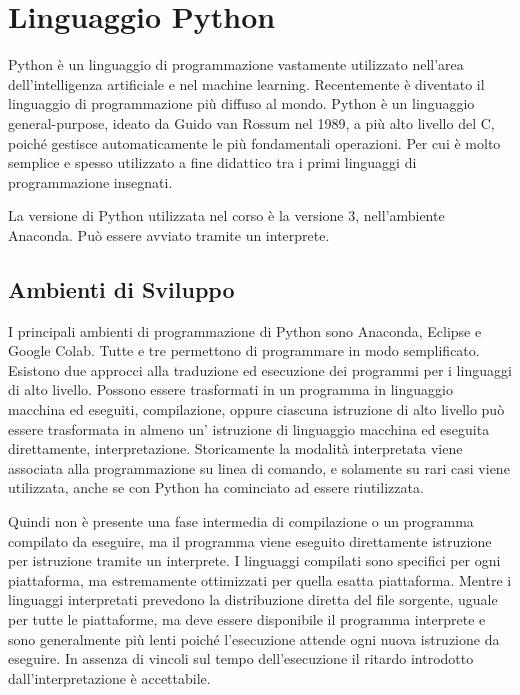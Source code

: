 \documentclass{article}
\numberwithin{equation}{subsection}
\begin{document}
\clearpage

\section{Linguaggio Python}

Python è un linguaggio di programmazione vastamente utilizzato nell'area dell'intelligenza artificiale e nel machine learning. Recentemente è diventato il linguaggio di 
programmazione più diffuso al mondo. Python è un linguaggio general-purpose, ideato da Guido van Rossum nel 1989, a più alto livello del C, poiché gestisce automaticamente le 
più fondamentali operazioni. Per cui è molto semplice e spesso utilizzato a fine didattico tra i primi linguaggi di programmazione insegnati. 

La versione di Python utilizzata nel corso è la versione 3, nell'ambiente Anaconda. Può essere avviato tramite un interprete. 

\subsection{Ambienti di Sviluppo}

I principali ambienti di programmazione di Python sono Anaconda, Eclipse e Google Colab. Tutte e 
tre permettono di programmare in modo semplificato. 
Esistono due approcci alla traduzione ed esecuzione dei programmi per i linguaggi di alto 
livello. Possono essere trasformati in un programma in linguaggio macchina ed eseguiti, 
compilazione, oppure ciascuna istruzione di alto livello può essere trasformata in almeno un'
istruzione di linguaggio macchina ed eseguita direttamente, interpretazione. 
Storicamente la modalità interpretata viene associata alla programmazione su linea di comando, 
e solamente su rari casi viene utilizzata, anche se con Python ha cominciato ad essere riutilizzata. 

Quindi non è presente una fase intermedia di compilazione o un programma compilato da 
eseguire, ma il programma viene eseguito direttamente istruzione per istruzione tramite un 
interprete. 
I linguaggi compilati sono specifici per ogni piattaforma, ma estremamente ottimizzati 
per quella esatta piattaforma. Mentre i linguaggi interpretati prevedono la 
distribuzione diretta del file sorgente, uguale per tutte le piattaforme, ma deve essere 
disponibile il programma interprete e sono generalmente più lenti poiché l'esecuzione attende 
ogni nuova istruzione da eseguire. 
In assenza di vincoli sul tempo dell'esecuzione il ritardo introdotto dall'interpretazione 
è accettabile. 
\end{document}
